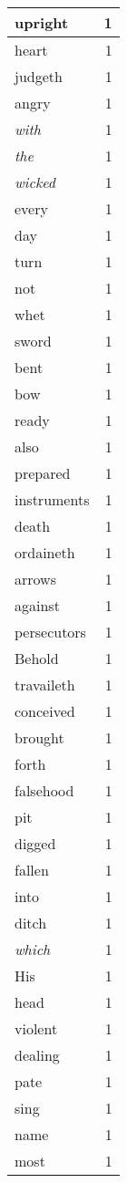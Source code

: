 \begin{center}
\begin{longtable}{l|r}
upright & 1 \\ \hline
heart & 1 \\ \hline
judgeth & 1 \\ \hline
angry & 1 \\ \hline
\emph{with} & 1 \\ \hline
\emph{the} & 1 \\ \hline
\emph{wicked} & 1 \\ \hline
every & 1 \\ \hline
day & 1 \\ \hline
turn & 1 \\ \hline
not & 1 \\ \hline
whet & 1 \\ \hline
sword & 1 \\ \hline
bent & 1 \\ \hline
bow & 1 \\ \hline
ready & 1 \\ \hline
also & 1 \\ \hline
prepared & 1 \\ \hline
instruments & 1 \\ \hline
death & 1 \\ \hline
ordaineth & 1 \\ \hline
arrows & 1 \\ \hline
against & 1 \\ \hline
persecutors & 1 \\ \hline
Behold & 1 \\ \hline
travaileth & 1 \\ \hline
conceived & 1 \\ \hline
brought & 1 \\ \hline
forth & 1 \\ \hline
falsehood & 1 \\ \hline
pit & 1 \\ \hline
digged & 1 \\ \hline
fallen & 1 \\ \hline
into & 1 \\ \hline
ditch & 1 \\ \hline
\emph{which} & 1 \\ \hline
His & 1 \\ \hline
head & 1 \\ \hline
violent & 1 \\ \hline
dealing & 1 \\ \hline
pate & 1 \\ \hline
sing & 1 \\ \hline
name & 1 \\ \hline
most & 1 \\ \hline
\end{longtable}
\end{center}



